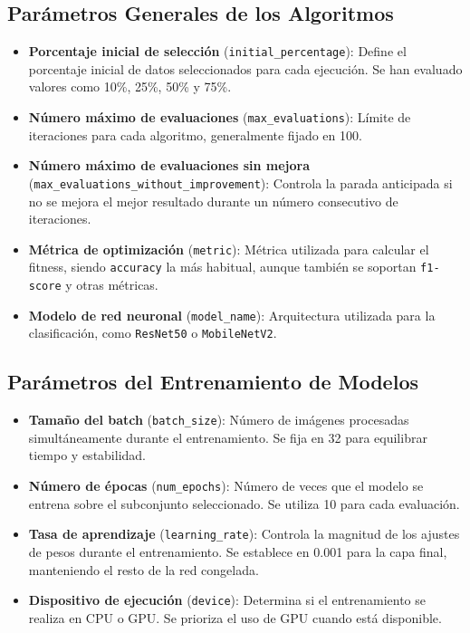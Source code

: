 \subsection{Parámetros Generales de los Algoritmos}
\begin{itemize}
    \item \textbf{Porcentaje inicial de selección} (\texttt{initial\_percentage}): Define el porcentaje inicial de datos seleccionados para cada ejecución.
          Se han evaluado valores como 10\%, 25\%, 50\% y 75\%.
    \item \textbf{Número máximo de evaluaciones} (\texttt{max\_evaluations}): Límite de iteraciones para cada algoritmo, generalmente fijado en 100.
    \item \textbf{Número máximo de evaluaciones sin mejora} \\(\texttt{max\_evaluations\_without\_improvement}): 
    Controla la parada anticipada si no se mejora el mejor resultado durante un número consecutivo de iteraciones.
    \item \textbf{Métrica de optimización} (\texttt{metric}): Métrica utilizada para calcular el fitness, 
    siendo \texttt{accuracy} la más habitual, aunque también se soportan \texttt{f1-score} y otras métricas.
    \item \textbf{Modelo de red neuronal} (\texttt{model\_name}): Arquitectura utilizada para la clasificación, como \texttt{ResNet50} o \texttt{MobileNetV2}.
\end{itemize}

\subsection{Parámetros del Entrenamiento de Modelos}

\begin{itemize}
    \item \textbf{Tamaño del batch} (\texttt{batch\_size}): Número de imágenes procesadas simultáneamente durante el entrenamiento.
          Se fija en 32 para equilibrar tiempo y estabilidad.
    \item \textbf{Número de épocas} (\texttt{num\_epochs}): Número de veces que el modelo se entrena sobre el subconjunto seleccionado.
          Se utiliza 10 para cada evaluación.
    \item \textbf{Tasa de aprendizaje} (\texttt{learning\_rate}): Controla la magnitud de los ajustes de pesos durante el entrenamiento.
          Se establece en 0.001 para la capa final, manteniendo el resto de la red congelada.
    \item \textbf{Dispositivo de ejecución} (\texttt{device}): Determina si el entrenamiento se realiza en CPU o GPU.
          Se prioriza el uso de GPU cuando está disponible.
\end{itemize}

